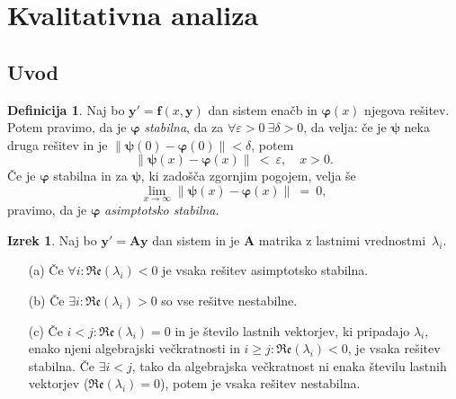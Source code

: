 \documentclass[11pt]{article}
\newcommand{\f}{\mathbf{f}}
\newcommand{\y}{\mathbf{y}}
\newcommand{\A}{\mathbf{A}}
\newcommand{\re}{\mathfrak{Re}}
\newcommand{\0}{\mathbf{0}}
\theoremstyle{definition}
\newtheorem{definicija}{Definicija}[section]
\theoremstyle{definition}
\theoremstyle{definition}
\newtheorem{izrek}{Izrek}[section]
\theoremstyle{definition}
\begin{document}

\pagebreak


\section{Kvalitativna analiza}
\vspace{0.5cm}


\subsection{Uvod}
\vspace{0.5cm}

\begin{definicija}

Naj bo $\y' = \f(x,\y)$ dan sistem enačb in $\bm{\varphi}(x)$ njegova rešitev. Potem pravimo, da je $\bm{\varphi}$ \textit{stabilna}, da za $\forall \varepsilon>0  ~\exists \delta > 0$, da velja: če je $\bm{\psi}$ neka druga rešitev in je $\|\bm{\psi}(0) - \bm{\varphi}(0)\| < \delta$, potem
$$\|\bm{\psi}(x) - \bm{\varphi}(x)\| ~<~ \varepsilon, \quad x > 0.$$
Če je $\bm{\varphi}$ stabilna in za $\bm{\psi}$, ki zadošča zgornjim pogojem, velja še
$$\lim_{x \rightarrow \infty} \|\bm{\psi}(x) - \bm{\varphi}(x)\| ~=~ 0,$$
pravimo, da je $\bm{\varphi}$ \textit{asimptotsko stabilna}.

\end{definicija}
\vspace{0.5cm}

\begin{izrek}

Naj bo $\y' = \A\y$ dan sistem in je $\A$ matrika z lastnimi \hbox{vrednostmi $\lambda_i$.}
\begin{enumerate}
	
\item[(a)] Če $\forall i:\re(\lambda_i) < 0$ je vsaka rešitev asimptotsko stabilna.

\item[(b)] Če $\exists i: \re(\lambda_i) > 0$ so vse rešitve nestabilne.

\item[(c)] Če $i<j: \re(\lambda_i) = 0$ in je število lastnih vektorjev, ki pripadajo $\lambda_i$, enako njeni algebrajski večkratnosti in $i \geq j: \re(\lambda_i) < 0$, je vsaka rešitev stabilna. Če $\exists i<j$, tako da algebrajska večkratnost ni enaka številu lastnih vektorjev ($\re(\lambda_i)=0$), potem je vsaka rešitev nestabilna.	
	
\end{enumerate}

\end{izrek}
\vspace{0.5cm}
\end{document}
